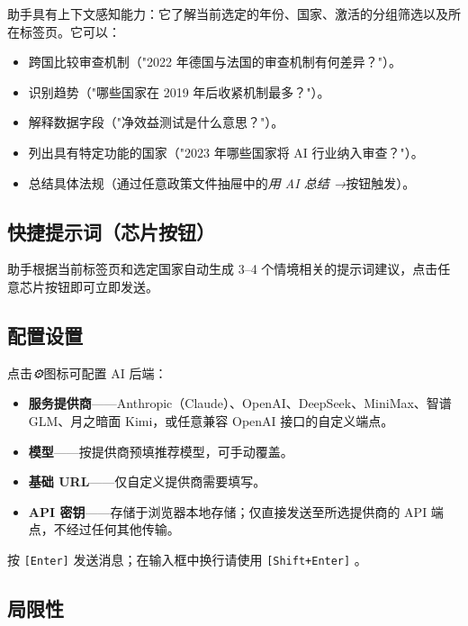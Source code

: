 \documentclass[12pt,a4paper]{article}
\newcommand{\keycap}[1]{%
  \texttt{\footnotesize[#1]}%
}
\newcommand{\uielem}[1]{\textit{#1}}
\begin{document}
助手具有上下文感知能力：它了解当前选定的年份、国家、激活的分组筛选以及所在标签页。它可以：

\begin{itemize}
  \item 跨国比较审查机制（"2022 年德国与法国的审查机制有何差异？"）。
  \item 识别趋势（"哪些国家在 2019 年后收紧机制最多？"）。
  \item 解释数据字段（"净效益测试是什么意思？"）。
  \item 列出具有特定功能的国家（"2023 年哪些国家将 AI 行业纳入审查？"）。
  \item 总结具体法规（通过任意政策文件抽屉中的\uielem{用 AI 总结 →}按钮触发）。
\end{itemize}

\subsection{快捷提示词（芯片按钮）}

助手根据当前标签页和选定国家自动生成 3--4 个情境相关的提示词建议，点击任意芯片按钮即可立即发送。

\subsection{配置设置}

点击\uielem{⚙}图标可配置 AI 后端：

\begin{itemize}
  \item \textbf{服务提供商}——Anthropic（Claude）、OpenAI、DeepSeek、MiniMax、智谱 GLM、月之暗面 Kimi，或任意兼容 OpenAI 接口的自定义端点。
  \item \textbf{模型}——按提供商预填推荐模型，可手动覆盖。
  \item \textbf{基础 URL}——仅自定义提供商需要填写。
  \item \textbf{API 密钥}——存储于浏览器本地存储；仅直接发送至所选提供商的 API 端点，不经过任何其他传输。
\end{itemize}

\begin{tipbox}[键盘快捷键]
按 \keycap{Enter} 发送消息；在输入框中换行请使用 \keycap{Shift+Enter}。
\end{tipbox}

\subsection{局限性}
\end{document}

